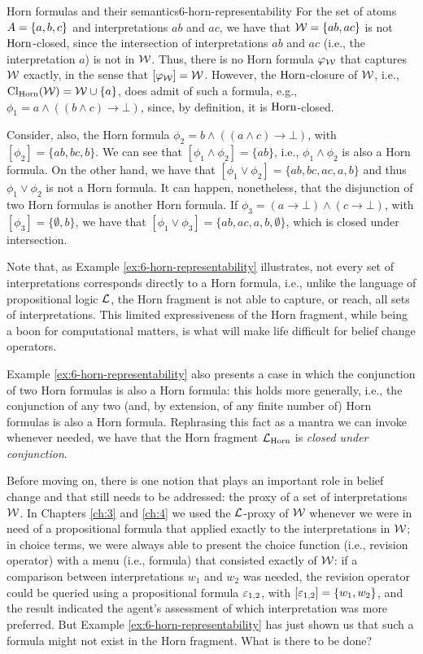 \begin{xmpl}{Horn formulas and their semantics}{6-horn-representability}
	For the set of atoms $A=\{a,b,c\}$ and interpretations $ab$ and $ac$,
	we have that $\mathcal{W}=\{ab,ac\}$ is not $\mathrm{Horn}$-closed, since 
	the intersection of interpretations $ab$ and $ac$ 
	(i.e., the interpretation $a$)
	is not in $\mathcal{W}$. 
	Thus, there is no Horn formula $\varphi_{\mathcal{W}}$ that captures $\mathcal{W}$ exactly,
	in the sense that $[\varphi_{\mathcal{W}}]=\mathcal{W}$.
	However, the $\mathrm{Horn}$-closure of $\mathcal{W}$,
	i.e., ${\operatorname{Cl}}_{\mathrm{Horn}}(\mathcal{W})=\mathcal{W}\cup\{a\}$, 
	does admit of such a formula, 
	e.g., $\phi_1=a\land ((b\land c)\rightarrow\bot)$,
	since, by definition,
	it is $\mathrm{Horn}$-closed.
	

	Consider, also, the Horn formula 
	$\phi_{2} = b\land ((a\land c)\rightarrow\bot)$, with 
	$[\phi_{2}]=\{ab,bc,b\}$.
	We can see that $[\phi_{1}\land \phi_{2}]=\{ab\}$,
	i.e., $\phi_{1}\land \phi_{2}$ is also a Horn formula.
	On the other hand, 
	we have that 
	$[\phi_{1}\lor\phi_{2}] = \{ab,bc,ac,a,b\}$
	and thus $\phi_{1}\lor\phi_{2}$ is not a Horn formula.
	It can happen, nonetheless, that the disjunction of two Horn 
	formulas is another Horn formula.
	If $\phi_{3} = (a\rightarrow\bot)\land(c\rightarrow\bot)$,
	with $[\phi_{3}]=\{\emptyset,b\}$,
	we have that $[\phi_{1}\lor \phi_{3}]=\{ab,ac,a,b,\emptyset\}$,
	which is closed under intersection.
\end{xmpl}

Note that, as Example \ref{ex:6-horn-representability} illustrates,
not every set of interpretations corresponds directly to a Horn formula,
i.e., unlike the language of propositional logic $\mathcal{L}$,
the Horn fragment is not able to capture, or reach, all sets of interpretations.
This limited expressiveness of the Horn fragment, 
while being a boon for computational matters,
is what will make life difficult for belief change operators.

Example \ref{ex:6-horn-representability} also presents a case in which 
the conjunction of two Horn formulas is also a Horn formula:
this holds more generally, i.e., the conjunction of any two 
(and, by extension, of any finite number of) 
Horn formulas is also a Horn formula. 
Rephrasing this fact as a mantra we can invoke whenever needed,
we have that the Horn fragment $\mathcal{L}_{\mathrm{Horn}}$ is \emph{closed under conjunction}. 

Before moving on, there is one notion that plays an important role 
in belief change and that still needs to be addressed:
the proxy of a set of interpretations $\mathcal{W}$.
In Chapters \ref{ch:3} and \ref{ch:4} we used the $\mathcal{L}$-proxy
of $\mathcal{W}$ whenever we were in need of a propositional formula that 
applied exactly to the interpretations in $\mathcal{W}$;
in choice terms, we were always able to present the 
choice function (i.e., revision operator) with a menu
(i.e., formula) that consisted exactly of $\mathcal{W}$:
if a comparison between interpretations $w_1$ and $w_2$ 
was needed, the revision operator could be queried using a propositional
formula $\varepsilon_{1,2}$, with $[\varepsilon_{1,2}]=\{w_1,w_2\}$,
and the result indicated the agent's assessment of which interpretation
was more preferred. 
But Example \ref{ex:6-horn-representability} has just shown us that 
such a formula might not exist in the Horn fragment.
What is there to be done?

